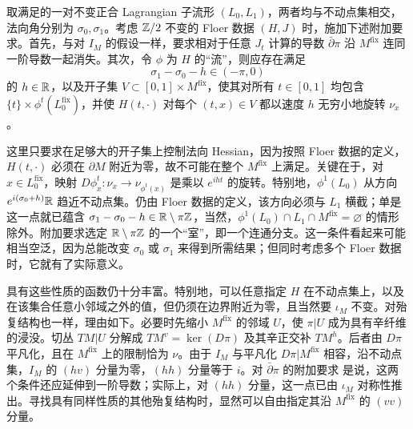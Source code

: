 \clearpage
{}\begin{assumption}\label{st:14.5}
取满足的一对不变正合 Lagrangian 子流形 $(L_0,L_1)$，两者均与不动点集相交，法向角分别为 $\sigma_0,\sigma_1$。考虑 $\mathbb Z/2$ 不变的 Floer 数据 $(H,J)$ 时，施加下述附加要求。首先，与对 $I_M$ 的假设一样，要求相对于任意 $J_t$ 计算的导数 $\bar\partial\pi$ 沿 $M^{\mathrm{fix}}$ 连同一阶导数一起消失。其次，令 $\phi$ 为 $H$ 的“流”，则应存在满足
\begin{equation}\label{eq:14.10}
\sigma_1-\sigma_0-h\in(-\pi,0)
\end{equation}
的 $h\in\mathbb R$，以及开子集 $V\subset[0,1]\times M^{\mathrm{fix}}$，使其对所有 $t\in[0,1]$ 均包含 $\{t\}\times\phi^t(L_0^{\mathrm{fix}})$，并使 $H(t,\cdot)$ 对每个 $(t,x)\in V$ 都以速度 $h$ 无穷小地旋转 $\nu_x$。
\end{assumption}

这里只要求在足够大的开子集上控制法向 Hessian，因为按照 Floer 数据的定义，$H(t,\cdot)$ 必须在 $\partial M$ 附近为零，故不可能在整个 $M^{\mathrm{fix}}$ 上满足。关键在于，对 $x\in L_0^{\mathrm{fix}}$，映射 $D\phi_x^t:\nu_x\to\nu_{\phi^t(x)}$ 是乘以 $e^{iht}$ 的旋转。特别地，$\phi^1(L_0)$ 从方向 $e^{i(\sigma_0+h)}\mathbb R$ 趋近不动点集。仍由 Floer 数据的定义，该方向必须与 $L_1$ 横截；单是这一点就已蕴含 $\sigma_1-\sigma_0-h\in\mathbb R\setminus\pi\mathbb Z$，当然，$\phi^1(L_0)\cap L_1\cap M^{\mathrm{fix}}=\varnothing$ 的情形除外。附加要求选定 $\mathbb R\setminus\pi\mathbb Z$ 的一个“室”，即一个连通分支。这一条件看起来可能相当空泛，因为总能改变 $\sigma_0$ 或 $\sigma_1$ 来得到所需结果；但同时考虑多个 Floer 数据时，它就有了实际意义。

具有这些性质的函数仍十分丰富。特别地，可以任意指定 $H$ 在不动点集上，以及在该集合任意小邻域之外的值，但仍须在边界附近为零，且当然要 $\iota_M$ 不变。对殆复结构也一样，理由如下。必要时先缩小 $M^{\mathrm{fix}}$ 的邻域 $U$，使 $\pi|U$ 成为具有辛纤维的浸没。切丛 $TM|U$ 分解成 $TM^v=\ker(D\pi)$ 及其辛正交补 $TM^h$。后者由 $D\pi$ 平凡化，且在 $M^{\mathrm{fix}}$ 上的限制恰为 $\nu$。由于 $I_M$ 与平凡化 $D\pi|M^{\mathrm{fix}}$ 相容，沿不动点集，$I_M$ 的 $(hv)$ 分量为零，$(hh)$ 分量等于 $i$。对 $\bar\partial\pi$ 的附加要求
是说，这两个条件还应延伸到一阶导数；实际上，对 $(hh)$ 分量，这一点已由 $\iota_M$ 对称性推出。寻找具有同样性质的其他殆复结构时，显然可以自由指定其沿 $M^{\mathrm{fix}}$ 的 $(vv)$ 分量。

